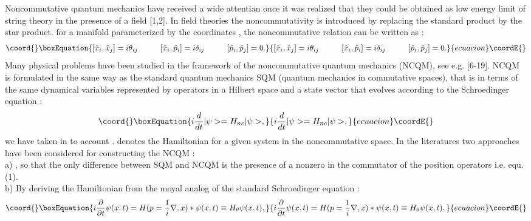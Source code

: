 \documentclass[a4paper,a4paper]{article}
\begin{document}
Noncommutative quantum mechanics have received a wide attentian
once it was realized that they could be obtained as low energy
limit of string theory in the presence of a \coordHE{} field [1,2]. In
field theories the noncommutativity is introduced by replacing the
standard product by the star product. for a manifold parameterized
by the coordinates \coordHE{}, the noncommutative relation can be
written as :
\begin{equation}\coord{}\boxEquation{
[\hat{x}_{i},\hat{x}_{j}]=i\theta_{ij}\hspace{1.cm}[\hat{x}_{i},\hat{p}_{i}]=i\delta
_{ij}\hspace{1.cm} [\hat{p}_{i},\hat{p}_{j}]=0 .
}{
[\hat{x}_{i},\hat{x}_{j}]=i\theta_{ij}\hspace{1.cm}[\hat{x}_{i},\hat{p}_{i}]=i\delta
_{ij}\hspace{1.cm} [\hat{p}_{i},\hat{p}_{j}]=0 .
}{ecuacion}\coordE{}\end{equation}
Many physical problems have been studied in the framework of the
noncommutative quantum mechanics (NCQM), see e.g. [6-19]. NCQM is
formulated in the same way as the standard quantum mechanics SQM
(quantum mechanics in commutative spaces), that is in terms of the
same dynamical variables represented by operators in a Hilbert
space and a state vector that evolves according to the
Schroedinger equation :
\begin{equation}\coord{}\boxEquation{
i\frac{d}{dt}|\psi>=H_{nc}|\psi> ,
}{
i\frac{d}{dt}|\psi>=H_{nc}|\psi> ,
}{ecuacion}\coordE{}\end{equation}
we have taken in to account \coordHE{}. \coordHE{}
denotes the Hamiltonian for a given system in the noncommutative
space. In the literatures two
approaches have been considered  for constructing the NCQM :\\
a) \coordHE{}, so that the only difference between SQM and
NCQM is the presence of a nonzero \myHighlight{$\theta$}\coordHE{} in the commutator of
the position operators i.e. equ.(1). \\
b) By deriving the Hamiltonian from the moyal analog of the
standard Schroedinger equation :
\begin{equation}\coord{}\boxEquation{
i\frac{\partial}{\partial t}\psi(x,t)=H(p=\frac{1}{i}\nabla,x)\ast
\psi (x,t)\equiv H_{\theta}\psi(x,t) ,
}{
i\frac{\partial}{\partial t}\psi(x,t)=H(p=\frac{1}{i}\nabla,x)\ast
\psi (x,t)\equiv H_{\theta}\psi(x,t) ,
}{ecuacion}\coordE{}\end{equation}
\end{document}
